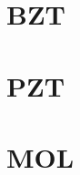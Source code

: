 \graphicspath{{../src/ZZT/img/}}
\part{BZT}\label{part:BZT}
\parttoc

{
  
} %


\part{PZT}\label{part:PZT}
\parttoc

{
%  
%  
%  
} %

\part{MOL}\label{part:MOL}
\parttoc

{
%  
} %

